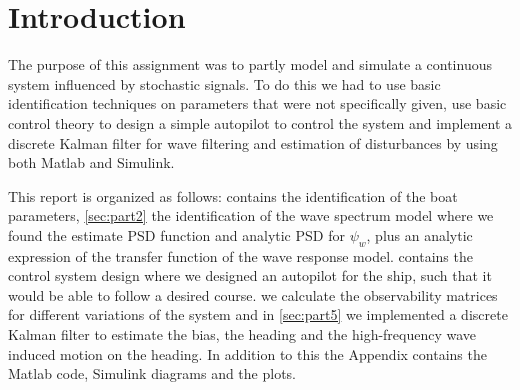 
\section*{Introduction}

The purpose of this assignment was to partly model and simulate a continuous system influenced by stochastic signals. To do this we had to use basic identification techniques on parameters that were not specifically given, use basic control theory to design a simple autopilot to control the system and implement a discrete Kalman filter for wave filtering and estimation of disturbances by using both Matlab and Simulink.

This report is organized as follows:  contains the identification of the boat parameters, \cref{sec:part2} the identification of the wave spectrum model where we found the estimate PSD function and analytic PSD for $\psi_w$, plus an analytic expression of the transfer function of the wave response model.  contains the control system design where we designed an autopilot for the ship, such that it would be able to follow a desired course.  we calculate the observability matrices for different variations of the system and in \cref{sec:part5} we implemented a discrete Kalman filter to estimate the bias, the heading and the high-frequency wave induced motion on the heading. In addition to this the Appendix contains the Matlab code, Simulink diagrams and the plots. 
